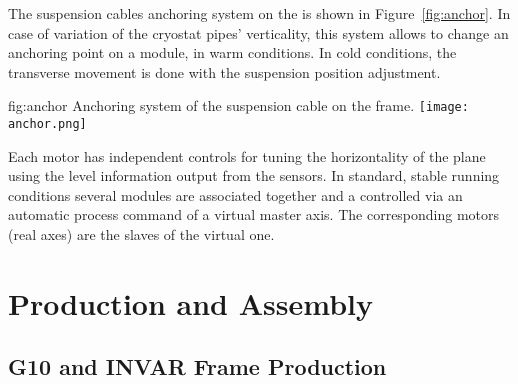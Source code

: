 The suspension cables anchoring system on the  is shown in Figure~\ref{fig:anchor}. 
In case of variation of the cryostat pipes' verticality, this system allows to change an anchoring point on a module, in warm conditions. In cold conditions, the transverse movement is done with the suspension \fdth position adjustment.
\begin{dunefigure}{fig:anchor}
{Anchoring system of the suspension cable on the  frame.}
\texttt{[image: anchor.png]}
\end{dunefigure}

Each motor has independent controls for tuning the horizontality of the plane using the  level information output from the %
sensors. In standard, stable running  conditions several  modules are associated together and a controlled via an automatic process command of a virtual master axis.
The corresponding motors (real axes) are the slaves of the virtual one.


\section{Production and Assembly}
\label{sec:fddp-crp-prod-assy}

\subsection{G10 and INVAR Frame Production}
\label{sec:fddp-crp-frame}

